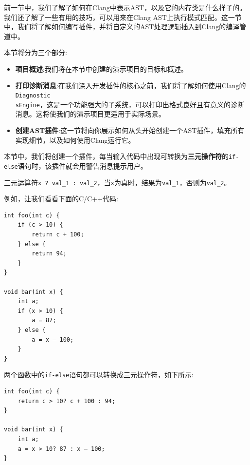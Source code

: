 
前一节中，我们了解了如何在Clang中表示AST，以及它的内存类是什么样子的。我们还了解了一些有用的技巧，可以用来在Clang AST上执行模式匹配。这一节中，我们将了解如何编写插件，并将自定义的AST处理逻辑插入到Clang的编译管道中。

本节将分为三个部分:

\begin{itemize}
\item \textbf{项目概述}:我们将在本节中创建的演示项目的目标和概述。

\item \textbf{打印诊断消息}:在我们深入开发插件的核心之前，我们将了解如何使用Clang的\texttt{Diagnostic\\sEngine}，这是一个功能强大的子系统，可以打印出格式良好且有意义的诊断消息。这将使我们的演示项目更适用于实际场景。

\item \textbf{创建AST插件}:这一节将向你展示如何从头开始创建一个AST插件，填充所有实现细节，以及如何使用Clang运行它。
\end{itemize}


本节中，我们将创建一个插件，每当输入代码中出现可转换为\textbf{三元操作符}的\texttt{if-else}语句时，该插件就会用警告消息提示用户。

\begin{tcolorbox}[colback=blue!5!white,colframe=blue!75!black, fonttitle=\bfseries,title=快速复习——三元运算符]
\hspace*{0.7cm}三元运算符\texttt{x ? val\_1 : val\_2}，当\texttt{x}为真时，结果为\texttt{val\_1}，否则为\texttt{val\_2}。
\end{tcolorbox}

例如，让我们看看下面的C/C++代码:

\begin{lstlisting}[style=styleCXX]
int foo(int c) {
	if (c > 10) {
		return c + 100;
	} else {
		return 94;
	}
}

void bar(int x) {
	int a;
	if (x > 10) {
		a = 87;
	} else {
		a = x – 100;
	}
}
\end{lstlisting}

两个函数中的\texttt{if-else}语句都可以转换成三元操作符，如下所示:

\begin{lstlisting}[style=styleCXX]
int foo(int c) {
	return c > 10? c + 100 : 94;
}

void bar(int x) {
	int a;
	a = x > 10? 87 : x – 100;
}
\end{lstlisting}

